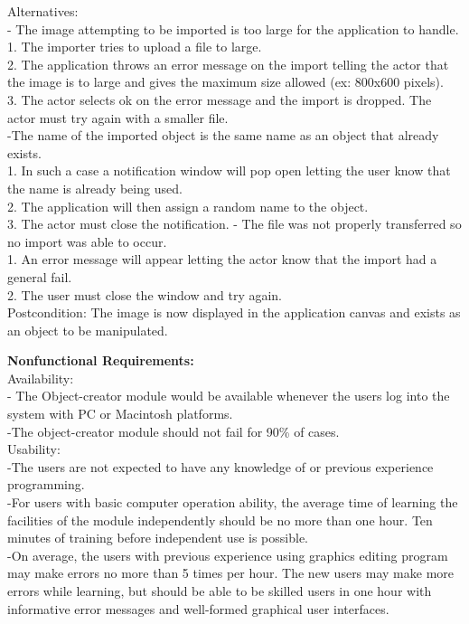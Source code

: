 \documentclass[12pt]{report}
\begin{document}
Alternatives:\\
- The image attempting to be imported is too large for the application to handle. \\{\parindent 10pt} 1. The importer tries to upload a file to large.\\
2. The application throws an error message on the import 	telling the actor that the image is to large and gives the maximum size allowed (ex: 800x600 pixels). \\
3. The actor selects ok on the error message and the import is dropped. The actor must try again with a smaller file.\\
-The name of the imported object is the same name as an object that already exists.\\
1. In such a case a notification window will pop open letting the user know that the name is already being used. \\
2. The application will then assign a random name to the object.\\
3. The actor must close the notification.
- The file was not properly transferred so no import was able to occur.\\
1. An error message will appear letting the actor know that the import had a general fail. \\
2. The user must close the window and try again.\\
Postcondition:  The image is now displayed in the application canvas and exists as an object to be manipulated.

\pagebreak


{\bf\large Nonfunctional Requirements:}\\[1\baselineskip]
Availability: \\
- The Object-creator module would be available whenever the users log into the system with PC or Macintosh platforms.\\
-The object-creator module should not fail for 90\% of cases.\\[0\baselineskip]

Usability: \\
-The users are not expected to have any knowledge of or previous experience programming.\\
-For users with basic computer operation ability, the average time of learning the facilities of the module independently should be no more than one hour. Ten minutes of training before independent use is possible. \\
-On average, the users with previous experience using graphics editing program may make errors no more than 5 times per hour. The new users may make more errors while learning, but should be able to be skilled users in one hour with informative error messages and well-formed graphical user interfaces.\\[0\baselineskip]
\end{document}
